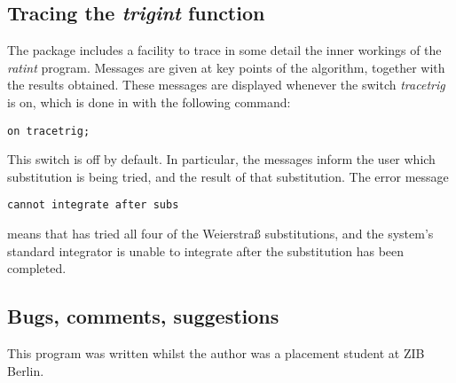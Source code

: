 \subsection{Tracing the \emph{trigint} function}

The package includes a facility to trace in some detail the inner workings of the \emph{ratint} program. Messages are given at key points of the algorithm, together with the results obtained. These messages are displayed whenever the switch \emph{tracetrig} is on, which is done in \REDUCE with the following command:
\begin{verbatim}
on tracetrig;
\end{verbatim}
This switch is off by default. In particular, the messages inform the user which substitution is being tried, and the result of that substitution. The error message
\begin{verbatim}
cannot integrate after subs
\end{verbatim}
means that \REDUCE has tried all four of the Weierstra\ss \hspace{1 mm} substitutions, and the system's standard integrator is unable to integrate after the substitution has been completed.

\subsection{Bugs, comments, suggestions}
This program was written whilst the author was a placement student at ZIB Berlin.
